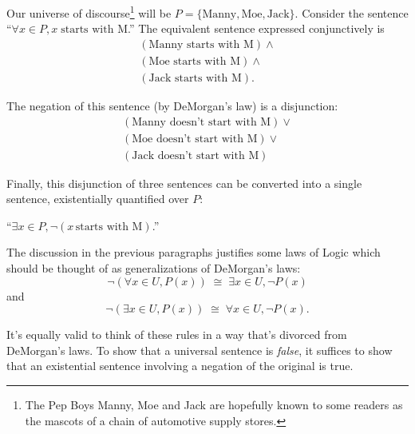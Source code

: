 \documentclass[10pt,]{book}
\theoremstyle{plain}
\theoremstyle{definition}
\theoremstyle{definition}
\numberwithin{equation}{section}
\begin{document}
    Our universe of discourse\footnote{The Pep Boys \textemdash{} Manny, Moe and 
    Jack \textemdash{} are hopefully known to some readers as the mascots of a chain 
    of automotive supply stores.\label{fn-17}}
    will be \(P = \{ \mbox{Manny} , \mbox{Moe} , \mbox{Jack}  \}\).
    Consider the sentence
    ``\(\forall x \in P, x\; \mbox{starts with M}\).'' The equivalent sentence
    expressed conjunctively is
    \begin{gather*}
(\mbox{Manny starts with M} ) \land\\
(\mbox{Moe starts with M} ) \land\\
(\mbox{Jack starts with M} ).
\end{gather*}
\par

    The negation
    of this sentence (by DeMorgan's law) is a disjunction:
    \begin{gather*}
(\mbox{Manny doesn't start with M} ) \lor\\
(\mbox{Moe doesn't start with M} ) \lor\\
(\mbox{Jack doesn't start with M} )
\end{gather*}
\par

    Finally, this disjunction of three sentences can be converted into
    a single sentence, existentially quantified over \(P\):
\par

    ``\(\exists x \in P, {\lnot}(x \, \mbox{starts with M} )\).''
\par

    The discussion in the previous paragraphs justifies some laws of
    Logic which should be thought of as generalizations of DeMorgan's laws:
    \begin{equation*}
      {\lnot}( \forall x \in U, P(x)) \; \cong \; \exists x \in U, {\lnot}P(x)
    \end{equation*}
    and
    \begin{equation*}
      {\lnot}( \exists x \in U, P(x)) \; \cong \; \forall x \in U, {\lnot}P(x).
    \end{equation*}
\par

    It's equally valid to think of these rules in a way that's divorced from
    DeMorgan's laws. To show that a universal sentence is \emph{false}, it suffices
    to show that an existential sentence involving a negation of the original is
    true.
\par
\end{document}
